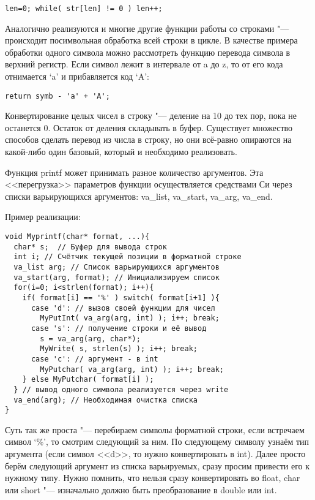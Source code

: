 \documentclass[10pt, a5paper]{article}
\begin{document}
\begin{lstlisting}
len=0; while( str[len] != 0 ) len++;
\end{lstlisting}

Аналогично реализуются и многие другие функции работы со строками "--- происходит посимвольная обработка всей строки в цикле. В качестве примера обработки одного символа можно рассмотреть функцию перевода символа в верхний регистр. Если символ лежит в интервале от a до z, то от его кода отнимается `a' и прибавляется код `A':

\begin{lstlisting}
return symb - 'a' + 'A';
\end{lstlisting}

Конвертирование целых чисел в строку "--- деление на 10 до тех пор, пока не останется 0. Остаток от деления складывать в буфер. Существует множество способов сделать перевод из числа в строку, но они всё-равно опираются на какой-либо один базовый, который и необходимо реализовать.

Функция printf может принимать разное количество аргументов. Эта <<перегрузка>> параметров функции осуществляется средствами Си через списки варьирующихся аргументов: va\_list, \linebreak va\_start, va\_arg, va\_end.

Пример реализации:

\begin{verbatim}
void Myprintf(char* format, ...){
  char* s;  // Буфер для вывода строк 
  int i; // Счётчик текущей позиции в форматной строке
  va_list arg; // Список варьирующихся аргументов
  va_start(arg, format); // Инициализируем список
  for(i=0; i<strlen(format); i++){
    if( format[i] == '%' ) switch( format[i+1] ){
      case 'd': // вызов своей функции для чисел
        MyPutInt( va_arg(arg, int) ); i++; break;
      case 's': // получение строки и её вывод
        s = va_arg(arg, char*);  
        MyWrite( s, strlen(s) ); i++; break;
      case 'c': // аргумент - в int
        MyPutchar( va_arg(arg, int) ); i++; break;
    } else MyPutchar( format[i] );
  } // вывод одного символа реализуется через write
  va_end(arg); // Необходимая очистка списка
}
\end{verbatim}

Суть так же проста "--- перебираем символы форматной строки, если встречаем символ `\%', то смотрим следующий за ним. По следующему символу узнаём тип аргумента (если символ <<d>>, то нужно конвертировать в int). Далее просто берём следующий аргумент из списка варьируемых, сразу просим привести его к нужному типу. Нужно помнить, что нельзя сразу конвертировать во float, char или short "--- изначально должно быть преобразование в double или int.
\end{document}
